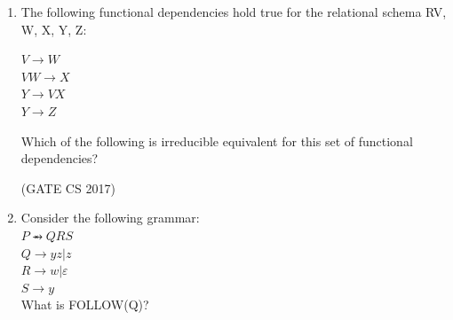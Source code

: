 \documentclass[a4paper, 11pt]{article}
\begin{document}
\begin{enumerate}
    \item The following functional dependencies hold true for the relational schema R{V, W, X, Y, Z}:
    \begin{center}
        $V\rightarrow W$\\
        $VW\rightarrow X$\\
        $Y\rightarrow VX$\\
        $Y\rightarrow Z$
    \end{center}
    Which of the following is irreducible equivalent for this set of functional dependencies?
    
    \begin{enumerate}
    \end{enumerate}
    
    \hfill (GATE CS 2017)
    
    \item Consider the following grammar:\\
    $P \rightarrowx QRS$\\
    $Q\rightarrow yz | z$\\
    $R\rightarrow w | \varepsilon$\\
    $S\rightarrow y$\\
    What is FOLLOW(Q)?
    
    \begin{enumerate}
    \end{enumerate}
    

\end{enumerate}
\end{document}
